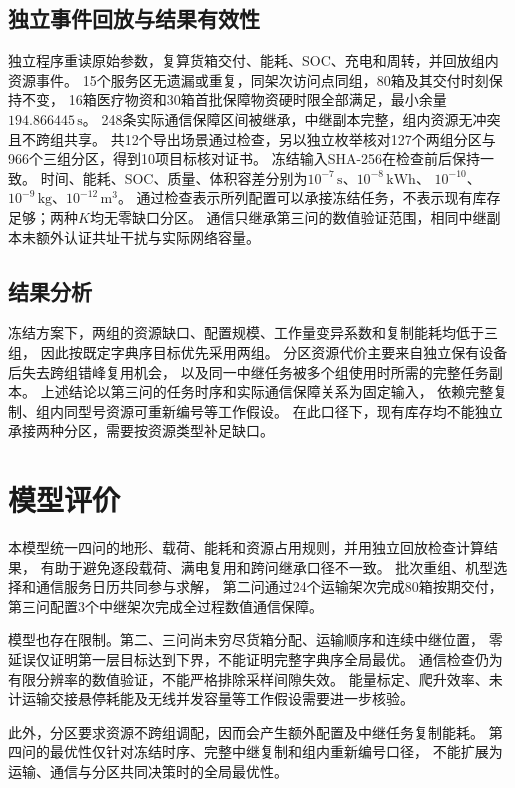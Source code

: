 \documentclass[bwprint]{gmcmthesis}
\begin{document}
\subsection{独立事件回放与结果有效性}
独立程序重读原始参数，复算货箱交付、能耗、SOC、充电和周转，并回放组内资源事件。
15个服务区无遗漏或重复，同架次访问点同组，80箱及其交付时刻保持不变，
16箱医疗物资和30箱首批保障物资硬时限全部满足，最小余量$194.866445\,\mathrm{s}$。
248条实际通信保障区间被继承，中继副本完整，组内资源无冲突且不跨组共享。
共12个导出场景通过检查，另以独立枚举核对127个两组分区与966个三组分区，得到10项目标核对证书。
冻结输入SHA-256在检查前后保持一致。
时间、能耗、SOC、质量、体积容差分别为$10^{-7}\,\mathrm{s}$、$10^{-8}\,\mathrm{kWh}$、
$10^{-10}$、$10^{-9}\,\mathrm{kg}$、$10^{-12}\,\mathrm{m^3}$。
通过检查表示所列配置可以承接冻结任务，不表示现有库存足够；两种$K$均无零缺口分区。
通信只继承第三问的数值验证范围，相同中继副本未额外认证共址干扰与实际网络容量。

\subsection{结果分析}
冻结方案下，两组的资源缺口、配置规模、工作量变异系数和复制能耗均低于三组，
因此按既定字典序目标优先采用两组。
分区资源代价主要来自独立保有设备后失去跨组错峰复用机会，
以及同一中继任务被多个组使用时所需的完整任务副本。
上述结论以第三问的任务时序和实际通信保障关系为固定输入，
依赖完整复制、组内同型号资源可重新编号等工作假设。
在此口径下，现有库存均不能独立承接两种分区，需要按资源类型补足缺口。

\section{模型评价}

本模型统一四问的地形、载荷、能耗和资源占用规则，并用独立回放检查计算结果，
有助于避免逐段载荷、满电复用和跨问继承口径不一致。
批次重组、机型选择和通信服务日历共同参与求解，
第二问通过24个运输架次完成80箱按期交付，
第三问配置3个中继架次完成全过程数值通信保障。

模型也存在限制。第二、三问尚未穷尽货箱分配、运输顺序和连续中继位置，
零延误仅证明第一层目标达到下界，不能证明完整字典序全局最优。
通信检查仍为有限分辨率的数值验证，不能严格排除采样间隙失效。
能量标定、爬升效率、未计运输交接悬停耗能及无线并发容量等工作假设需要进一步核验。

此外，分区要求资源不跨组调配，因而会产生额外配置及中继任务复制能耗。
第四问的最优性仅针对冻结时序、完整中继复制和组内重新编号口径，
不能扩展为运输、通信与分区共同决策时的全局最优性。
\end{document}
